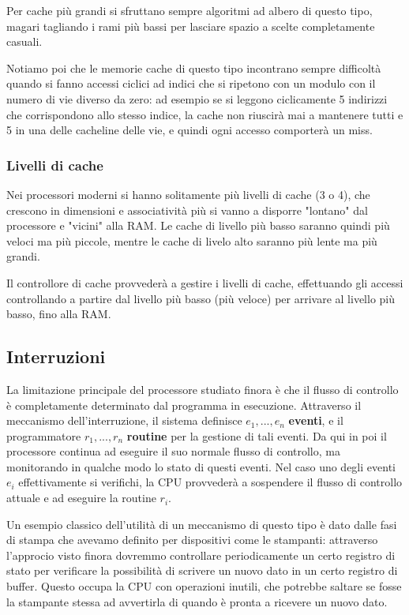 \documentclass[a4paper,11pt]{article}
\begin{document}
Per cache più grandi si sfruttano sempre algoritmi ad albero di questo tipo, magari tagliando i rami più bassi per lasciare spazio a scelte completamente casuali.

Notiamo poi che le memorie cache di questo tipo incontrano sempre difficoltà quando si fanno accessi ciclici ad indici che si ripetono con un modulo con il numero di vie diverso da zero: ad esempio se si leggono ciclicamente 5 indirizzi che corrispondono allo stesso indice, la cache non riuscirà mai a mantenere tutti e 5 in una delle cacheline delle vie, e quindi ogni accesso comporterà un miss.

\subsubsection{Livelli di cache}
Nei processori moderni si hanno solitamente più livelli di cache (3 o 4), che crescono in dimensioni e associatività più si vanno a disporre "lontano" dal processore e "vicini" alla RAM.
Le cache di livello più basso saranno quindi più veloci ma più piccole, mentre le cache di livelo alto saranno più lente ma più grandi.

Il controllore di cache provvederà a gestire i livelli di cache, effettuando gli accessi controllando a partire dal livello più basso (più veloce) per arrivare al livello più basso, fino alla RAM.

\subsection{Interruzioni}
La limitazione principale del processore studiato finora è che il flusso di controllo è completamente determinato dal programma in esecuzione.
Attraverso il meccanismo dell'interruzione, il sistema definisce $e_1, ..., e_n$ \textbf{eventi}, e il programmatore $r_1, ..., r_n$ \textbf{routine} per la gestione di tali eventi.
Da qui in poi il processore continua ad eseguire il suo normale flusso di controllo, ma monitorando in qualche modo lo stato di questi eventi.
Nel caso uno degli eventi $e_i$ effettivamente si verifichi, la CPU provvederà a sospendere il flusso di controllo attuale e ad eseguire la routine $r_i$.

Un esempio classico dell'utilità di un meccanismo di questo tipo è dato dalle fasi di stampa che avevamo definito per dispositivi come le stampanti: attraverso l'approcio visto finora dovremmo controllare periodicamente un certo registro di stato per verificare la possibilità di scrivere un nuovo dato in un certo registro di buffer.
Questo occupa la CPU con operazioni inutili, che potrebbe saltare se fosse la stampante stessa ad avvertirla di quando è pronta a ricevere un nuovo dato.
\end{document}
